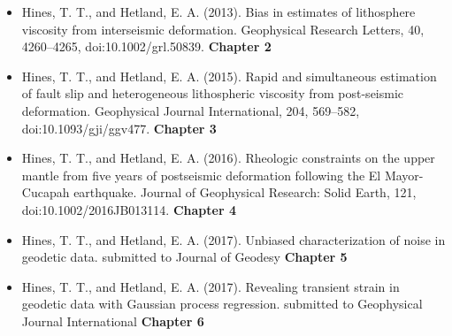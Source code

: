 \begin{itemize}
\item{Hines, T. T., and Hetland, E. A. (2013). Bias in estimates of lithosphere viscosity from interseismic deformation. Geophysical Research Letters, 40, 4260--4265, doi:10.1002/grl.50839. \textbf{Chapter 2}}  
\item{Hines, T. T., and Hetland, E. A. (2015). Rapid and simultaneous estimation of fault slip and heterogeneous lithospheric viscosity from post-seismic deformation. Geophysical Journal International, 204, 569–582, doi:10.1093/gji/ggv477. \textbf{Chapter 3}} 
\item{Hines, T. T., and Hetland, E. A. (2016). Rheologic constraints on the upper mantle from five years of postseismic deformation following the El Mayor-Cucapah earthquake. Journal of Geophysical Research: Solid Earth, 121, doi:10.1002/2016JB013114. \textbf{Chapter 4}}
\item{Hines, T. T., and Hetland, E. A. (2017). Unbiased characterization of noise in geodetic data. submitted to Journal of Geodesy \textbf{Chapter 5}}
\item{Hines, T. T., and Hetland, E. A. (2017). Revealing transient strain in geodetic data with Gaussian process regression. submitted to Geophysical Journal International \textbf{Chapter 6}} 
\end{itemize}
